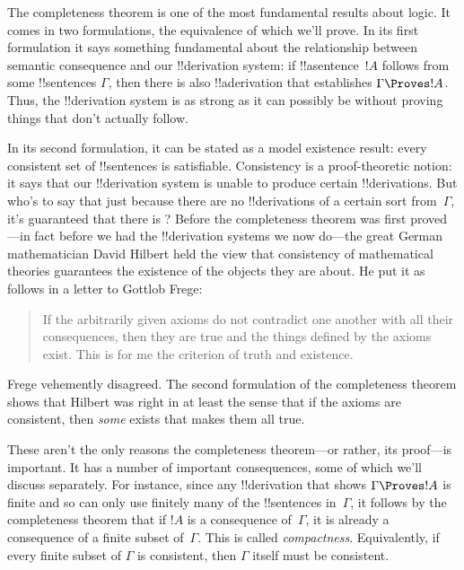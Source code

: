 \documentclass[../../../include/open-logic-section]{subfiles}
\begin{document}
      {}
      {}

The completeness theorem is one of the most fundamental results about
logic.  It comes in two formulations, the equivalence of which we'll
prove.  In its first formulation it says something fundamental about
the relationship between semantic consequence and our !!{derivation}
system: if !!a{sentence}~$!A$ follows from some !!{sentence}s
$\Gamma$, then there is also !!a{derivation} that establishes $\Gamma
\Proves !A$. Thus, the !!{derivation} system is as strong as it can
possibly be without proving things that don't actually follow.

In its second formulation, it can be stated as a model existence
result: every consistent set of !!{sentence}s is satisfiable.
Consistency is a proof-theoretic notion: it says that our
!!{derivation} system is unable to produce certain !!{derivation}s.
But who's to say that just because there are no !!{derivation}s of a
certain sort from~$\Gamma$, it's guaranteed that there is
? Before the
completeness theorem was first proved---in fact before we had the
!!{derivation} systems we now do---the great German mathematician
David Hilbert held the view that consistency of mathematical theories
guarantees the existence of the objects they are about. He put it as
follows in a letter to Gottlob Frege:
\begin{quote}
  If the arbitrarily given axioms do not contradict one another with
  all their consequences, then they are true and the things defined by
  the axioms exist. This is for me the criterion of truth and
  existence. 
\end{quote}
Frege vehemently disagreed. The second formulation of the completeness
theorem shows that Hilbert was right in at least the sense that if the
axioms are consistent, then \emph{some}
 exists that makes them all
true.

These aren't the only reasons the completeness theorem---or rather,
its proof---is important.  It has a number of important consequences,
some of which we'll discuss separately.  For instance, since any
!!{derivation} that shows $\Gamma \Proves !A$ is finite and so can
only use finitely many of the !!{sentence}s in~$\Gamma$, it follows by
the completeness theorem that if $!A$ is a consequence of~$\Gamma$, it
is already a consequence of a finite subset of~$\Gamma$.  This is
called \emph{compactness}.  Equivalently, if every finite subset of
$\Gamma$ is consistent, then $\Gamma$ itself must be consistent.
\end{document}
